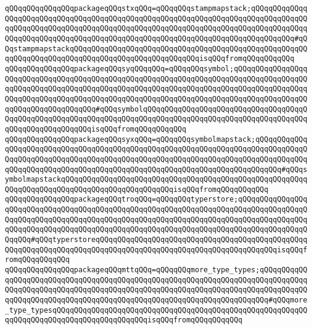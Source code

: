 \verb|qQQqqQQqqQQqqQQqpackageqQQqstxqQQq=qQQqqQQqstampmapstack;qQQqqQQqqQQqqQQqqQQqqQQqqQQqqQQqqQQqqQQqqQQqqQQqqQQqqQQqqQQqqQQqqQQqqQQqqQQqqQQqqQQqqQQqqQQqqQQqqQQqqQQqqQQqqQQqqQQqqQQqqQQqqQQqqQQqqQQqqQQqqQQqqQQqqQQqqQQqqQQqqQQqqQQqqQQqqQQqqQQqqQQqqQQqqQQqqQQqqQQqqQQqqQQqqQQqqQQqqQQq#qQQqstampmapstackqQQqqQQqqQQqqQQqqQQqqQQqqQQqqQQqqQQqqQQqqQQqqQQqqQQqqQQqqQQqqQQqqQQqqQQqqQQqqQQqqQQqqQQqqQQqqQQqqQQqisqQQqfromqQQqqQQqqQQq|\newline
\verb|qQQqqQQqqQQqqQQqpackageqQQqsyqQQqqQQq=qQQqqQQqsymbol;qQQqqQQqqQQqqQQqqQQqqQQqqQQqqQQqqQQqqQQqqQQqqQQqqQQqqQQqqQQqqQQqqQQqqQQqqQQqqQQqqQQqqQQqqQQqqQQqqQQqqQQqqQQqqQQqqQQqqQQqqQQqqQQqqQQqqQQqqQQqqQQqqQQqqQQqqQQqqQQqqQQqqQQqqQQqqQQqqQQqqQQqqQQqqQQqqQQqqQQqqQQqqQQqqQQqqQQqqQQqqQQqqQQqqQQqqQQqqQQqqQQqqQQq#qQQqsymbolqQQqqQQqqQQqqQQqqQQqqQQqqQQqqQQqqQQqqQQqqQQqqQQqqQQqqQQqqQQqqQQqqQQqqQQqqQQqqQQqqQQqqQQqqQQqqQQqqQQqqQQqqQQqqQQqqQQqqQQqqQQqqQQqisqQQqfromqQQqqQQqqQQq|\newline
\verb|qQQqqQQqqQQqqQQqpackageqQQqsyxqQQq=qQQqqQQqsymbolmapstack;qQQqqQQqqQQqqQQqqQQqqQQqqQQqqQQqqQQqqQQqqQQqqQQqqQQqqQQqqQQqqQQqqQQqqQQqqQQqqQQqqQQqqQQqqQQqqQQqqQQqqQQqqQQqqQQqqQQqqQQqqQQqqQQqqQQqqQQqqQQqqQQqqQQqqQQqqQQqqQQqqQQqqQQqqQQqqQQqqQQqqQQqqQQqqQQqqQQqqQQqqQQqqQQqqQQqqQQq#qQQqsymbolmapstackqQQqqQQqqQQqqQQqqQQqqQQqqQQqqQQqqQQqqQQqqQQqqQQqqQQqqQQqqQQqqQQqqQQqqQQqqQQqqQQqqQQqqQQqqQQqqQQqisqQQqfromqQQqqQQqqQQq|\newline
\verb|qQQqqQQqqQQqqQQqpackageqQQqtroqQQq=qQQqqQQqtyperstore;qQQqqQQqqQQqqQQqqQQqqQQqqQQqqQQqqQQqqQQqqQQqqQQqqQQqqQQqqQQqqQQqqQQqqQQqqQQqqQQqqQQqqQQqqQQqqQQqqQQqqQQqqQQqqQQqqQQqqQQqqQQqqQQqqQQqqQQqqQQqqQQqqQQqqQQqqQQqqQQqqQQqqQQqqQQqqQQqqQQqqQQqqQQqqQQqqQQqqQQqqQQqqQQqqQQqqQQqqQQqqQQqqQQqqQQq#qQQqtyperstoreqQQqqQQqqQQqqQQqqQQqqQQqqQQqqQQqqQQqqQQqqQQqqQQqqQQqqQQqqQQqqQQqqQQqqQQqqQQqqQQqqQQqqQQqqQQqqQQqqQQqqQQqqQQqqQQqisqQQqfromqQQqqQQqqQQq|\newline
\verb|qQQqqQQqqQQqqQQqpackageqQQqmttqQQq=qQQqqQQqmore_type_types;qQQqqQQqqQQqqQQqqQQqqQQqqQQqqQQqqQQqqQQqqQQqqQQqqQQqqQQqqQQqqQQqqQQqqQQqqQQqqQQqqQQqqQQqqQQqqQQqqQQqqQQqqQQqqQQqqQQqqQQqqQQqqQQqqQQqqQQqqQQqqQQqqQQqqQQqqQQqqQQqqQQqqQQqqQQqqQQqqQQqqQQqqQQqqQQqqQQqqQQqqQQqqQQqqQQq#qQQqmore_type_typesqQQqqQQqqQQqqQQqqQQqqQQqqQQqqQQqqQQqqQQqqQQqqQQqqQQqqQQqqQQqqQQqqQQqqQQqqQQqqQQqqQQqqQQqqQQqisqQQqfromqQQqqQQqqQQq|\newline
